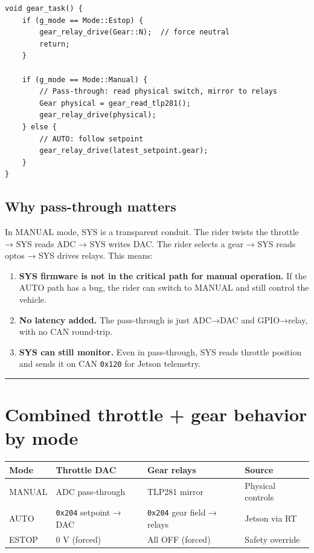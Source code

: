 \documentclass[12pt,a4paper,oneside]{report}
\providecommand{\tightlist}{\setlength{\itemsep}{0pt}\setlength{\parskip}{0pt}}
\begin{document}
\begin{verbatim}
void gear_task() {
    if (g_mode == Mode::Estop) {
        gear_relay_drive(Gear::N);  // force neutral
        return;
    }

    if (g_mode == Mode::Manual) {
        // Pass-through: read physical switch, mirror to relays
        Gear physical = gear_read_tlp281();
        gear_relay_drive(physical);
    } else {
        // AUTO: follow setpoint
        gear_relay_drive(latest_setpoint.gear);
    }
}
\end{verbatim}

\subsection{Why pass-through matters}\label{why-pass-through-matters}

In MANUAL mode, SYS is a transparent conduit. The rider twists the throttle →
SYS reads ADC → SYS writes DAC. The rider selects a gear → SYS reads optos → SYS
drives relays. This means:

\begin{enumerate}
\def\labelenumi{\arabic{enumi}.}
\tightlist
\item
  \textbf{SYS firmware is not in the critical path for manual operation.} If the
  AUTO path has a bug, the rider can switch to MANUAL and still control the
  vehicle.
\item
  \textbf{No latency added.} The pass-through is just ADC→DAC and GPIO→relay,
  with no CAN round-trip.
\item
  \textbf{SYS can still monitor.} Even in pass-through, SYS reads throttle
  position and sends it on CAN \texttt{0x120} for Jetson telemetry.
\end{enumerate}

\begin{center}\rule{0.5\linewidth}{0.5pt}\end{center}

\section{Combined throttle + gear behavior by
mode}\label{combined-throttle-gear-behavior-by-mode}

\begin{longtable}[]{@{}llll@{}}
\toprule\noalign{}
Mode & Throttle DAC & Gear relays & Source \\
\midrule\noalign{}
\endhead
\bottomrule\noalign{}
\endlastfoot
MANUAL & ADC pass-through & TLP281 mirror & Physical controls \\
AUTO & \texttt{0x204} setpoint → DAC & \texttt{0x204} gear field → relays &
Jetson via RT \\
ESTOP & 0 V (forced) & All OFF (forced) & Safety override \\
\end{longtable}
\end{document}
